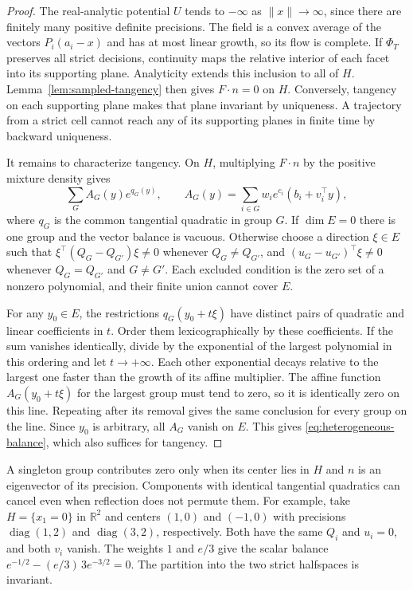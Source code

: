 \begin{proof}
The real-analytic potential $U$ tends to $-\infty$ as $\|x\|\to\infty$,
since there are finitely many positive definite precisions. The field
is a convex average of the vectors $P_i(a_i-x)$ and has at most linear
growth, so its flow is complete. If $\Phi_T$ preserves all strict
decisions, continuity maps the relative interior of each facet into
its supporting plane. Analyticity extends this inclusion to all of
$H$. Lemma~\ref{lem:sampled-tangency} then gives $F\cdot n=0$ on $H$.
Conversely, tangency on each supporting plane makes that plane invariant
by uniqueness. A trajectory from a strict cell cannot reach any of
its supporting planes in finite time by backward uniqueness.

It remains to characterize tangency. On $H$, multiplying
$F\cdot n$ by the positive mixture density gives
\[
 \sum_G A_G(y)e^{q_G(y)},\qquad
 A_G(y)=\sum_{i\in G}w_i e^{c_i}(b_i+v_i^\top y),
\]
where $q_G$ is the common tangential quadratic in group $G$.
If $\dim E=0$ there is one group and the vector balance is vacuous.
Otherwise choose a direction $\xi\in E$ such that
$\xi^\top(Q_G-Q_{G'})\xi\ne0$ whenever $Q_G\ne Q_{G'}$, and
$(u_G-u_{G'})^\top\xi\ne0$ whenever $Q_G=Q_{G'}$ and $G\ne G'$.
Each excluded condition is the zero set of a nonzero polynomial,
and their finite union cannot cover $E$.

For any $y_0\in E$, the restrictions $q_G(y_0+t\xi)$ have
distinct pairs of quadratic and linear coefficients in $t$.
Order them lexicographically by these coefficients. If the sum
vanishes identically, divide by the exponential of the largest
polynomial in this ordering and let $t\to+\infty$. Each other
exponential decays relative to the largest one faster than the growth
of its affine multiplier. The affine function $A_G(y_0+t\xi)$ for the
largest group must tend to zero, so it is identically zero on this
line. Repeating after its removal gives the same conclusion for
every group on the line. Since $y_0$ is arbitrary, all $A_G$ vanish
on $E$. This gives \eqref{eq:heterogeneous-balance}, which also
suffices for tangency.
\end{proof}

A singleton group contributes zero only when its center lies in $H$ and
$n$ is an eigenvector of its precision. Components with identical
tangential quadratics can cancel even when reflection does not
permute them. For example, take $H=\{x_1=0\}$ in $\mathbb R^2$ and
centers $(1,0)$ and $(-1,0)$ with precisions
$\operatorname{diag}(1,2)$ and $\operatorname{diag}(3,2)$,
respectively. Both have the same $Q_i$ and $u_i=0$, and both $v_i$
vanish. The weights $1$ and $e/3$ give the scalar balance
$e^{-1/2}-(e/3)\,3e^{-3/2}=0$. The partition into the two strict
halfspaces is invariant.
